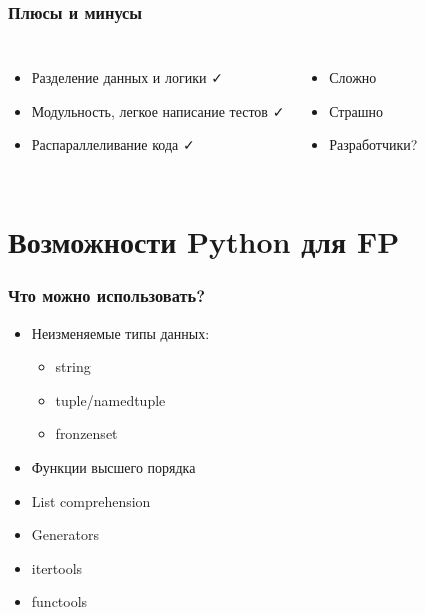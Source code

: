 \documentclass[18pt, compress, aspectratio=169]{beamer}
\def\check{\textcolor{check}{\FA \faCheck}}
\def\fail{\textcolor{fail}{\FA \faRemove}}
\begin{document}
\begin{frame}
    \frametitle{Плюсы и минусы}
    \vspace{-20pt}
    \begin{columns}[T,onlytextwidth]
        \begin{itemize}[label={\MVRightarrow}]
            \item <+->Разделение данных и логики \check
            \item <+->Модульность, легкое написание тестов \check
            \item <+->Распараллеливание кода \check
        \end{itemize}

        \begin{itemize}[label={\MVRightarrow}]
            \item <+->Сложно \fail
            \item <+->Страшно \fail
            \item <+->Разработчики? \fail
        \end{itemize}
    \end{columns}
    \end{frame}

\section{Возможности Python для FP}

\begin{frame}
    \frametitle{Что можно использовать?}
    \vspace{-25pt}
    \begin{itemize}[label={\MVRightarrow}]
        \item <+->Неизменяемые типы данных:
            \begin{itemize}
                \item string
                \item tuple/namedtuple
                \item fronzenset
            \end{itemize}
        \item <+->Функции высшего порядка
        \item <+->List comprehension
        \item <+->Generators
        \item <+->itertools
        \item <+->functools
    \end{itemize}
\end{frame}
\end{document}
